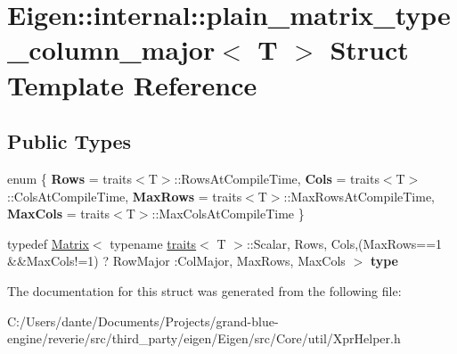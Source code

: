 \hypertarget{struct_eigen_1_1internal_1_1plain__matrix__type__column__major}{}\section{Eigen\+::internal\+::plain\+\_\+matrix\+\_\+type\+\_\+column\+\_\+major$<$ T $>$ Struct Template Reference}
\label{struct_eigen_1_1internal_1_1plain__matrix__type__column__major}
\subsection*{Public Types}
\begin{DoxyCompactItemize}
\item 
\mbox{\label{struct_eigen_1_1internal_1_1plain__matrix__type__column__major_afac1e719b93120f261918b691d87363e}} 
enum \{ {\bfseries Rows} = traits$<$T$>$\+::Rows\+At\+Compile\+Time, 
{\bfseries Cols} = traits$<$T$>$\+::Cols\+At\+Compile\+Time, 
{\bfseries Max\+Rows} = traits$<$T$>$\+::Max\+Rows\+At\+Compile\+Time, 
{\bfseries Max\+Cols} = traits$<$T$>$\+::Max\+Cols\+At\+Compile\+Time
 \}
\item 
\mbox{\label{struct_eigen_1_1internal_1_1plain__matrix__type__column__major_a654e6577d45ae0cfb657d21311124850}} 
typedef \mbox{\hyperlink{class_eigen_1_1_matrix}{Matrix}}$<$ typename \mbox{\hyperlink{struct_eigen_1_1internal_1_1traits}{traits}}$<$ T $>$\+::Scalar, Rows, Cols,(Max\+Rows==1 \&\&Max\+Cols!=1) ? Row\+Major \+:Col\+Major, Max\+Rows, Max\+Cols $>$ {\bfseries type}
\end{DoxyCompactItemize}


The documentation for this struct was generated from the following file\+:\begin{DoxyCompactItemize}
\item 
C\+:/\+Users/dante/\+Documents/\+Projects/grand-\/blue-\/engine/reverie/src/third\+\_\+party/eigen/\+Eigen/src/\+Core/util/Xpr\+Helper.\+h\end{DoxyCompactItemize}
